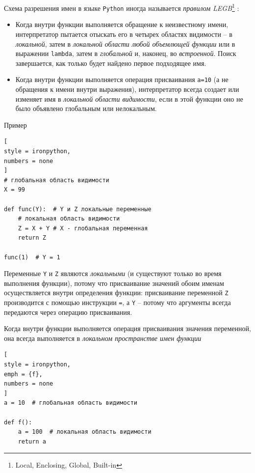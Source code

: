 \documentclass[%
	11pt,
	a4paper,
	utf8,
		]{article}
\begin{document}
Схема разрешения имен в языке \texttt{Python} иногда называется \emph{правилом LEGB}\footnote{Local, Enclosing, Global, Built-in} \cite[]{lutz:learningpython-2011}:

\begin{itemize}
	\item Когда внутри функции выполняется обращение к неизвестному имени, интерпретатор пытается отыскать его в четырех областях видимости -- в \emph{локальной}, затем в \emph{локальной области любой объемлющей функции} или в выражении \texttt{lambda}, затем в \emph{глобальной} и, наконец, во \emph{встроенной}. Поиск завершается, как только будет найдено первое подходящее имя.
	
	\item Когда внутри функции выполняется операция присваивания \lstinline{a=10} (а не обращения к имени внутри выражения), интерпретатор всегда создает или изменяет имя в \emph{локальной области видимости}, если в этой функции оно не было объявлено глобальным или нелокальным.
\end{itemize}

Пример

\begin{lstlisting}[
style = ironpython,
numbers = none
]
# глобальная область видимости
X = 99  

def func(Y):  # Y и Z локальные переменные
    # локальная область видимости
    Z = X + Y # X - глобальная переменная
    return Z
    
func(1)  # Y = 1
\end{lstlisting}

Переменные \texttt{Y} и \texttt{Z} являются \emph{локальными} (и существуют только во время выполнения функции), потому что присваивание значений обоим именам осуществляется внутри определения функции: присваивание переменной \texttt{Z} производится с помощью инструкции \texttt{=}, а \texttt{Y} -- потому что аргументы всегда передаются через операцию присваивания.

Когда внутри функции выполняется операция присваивания значения переменной, она всегда выполняется в \emph{локальном пространстве имен функции}

\begin{lstlisting}[
style = ironpython,
emph = {f},
numbers = none
]
a = 10  # глобальная область видимости

def f():
    a = 100  # локальная область видимости
    return a
\end{lstlisting}
\end{document}
